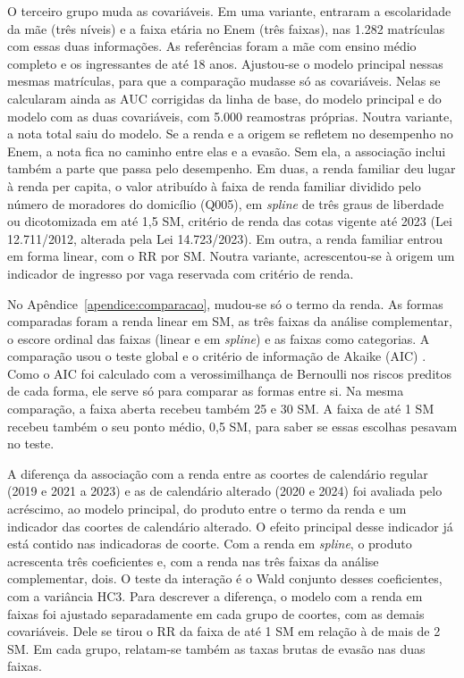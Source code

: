 \documentclass[12pt,a4paper]{article}
\begin{document}
O terceiro grupo muda as covariáveis. Em uma variante, entraram a escolaridade da mãe (três níveis) e a faixa etária no Enem (três faixas), nas 1.282 matrículas com essas duas informações. As referências foram a mãe com ensino médio completo e os ingressantes de até 18 anos. Ajustou-se o modelo principal nessas mesmas matrículas, para que a comparação mudasse só as covariáveis. Nelas se calcularam ainda as AUC corrigidas da linha de base, do modelo principal e do modelo com as duas covariáveis, com 5.000 reamostras próprias. Noutra variante, a nota total saiu do modelo. Se a renda e a origem se refletem no desempenho no Enem, a nota fica no caminho entre elas e a evasão. Sem ela, a associação inclui também a parte que passa pelo desempenho. Em duas, a renda familiar deu lugar à renda per capita, o valor atribuído à faixa de renda familiar dividido pelo número de moradores do domicílio (Q005), em \textit{spline} de três graus de liberdade ou dicotomizada em até 1,5 SM, critério de renda das cotas vigente até 2023 (Lei 12.711/2012, alterada pela Lei 14.723/2023). Em outra, a renda familiar entrou em forma linear, com o RR por SM. Noutra variante, acrescentou-se à origem um indicador de ingresso por vaga reservada com critério de renda.

No Apêndice~\ref{apendice:comparacao}, mudou-se só o termo da renda. As formas comparadas foram a renda linear em SM, as três faixas da análise complementar, o escore ordinal das faixas (linear e em \textit{spline}) e as faixas como categorias. A comparação usou o teste global e o critério de informação de Akaike (AIC) \citep{akaike1974new}. Como o AIC foi calculado com a verossimilhança de Bernoulli nos riscos preditos de cada forma, ele serve só para comparar as formas entre si. Na mesma comparação, a faixa aberta recebeu também 25 e 30 SM. A faixa de até 1 SM recebeu também o seu ponto médio, 0,5 SM, para saber se essas escolhas pesavam no teste.

A diferença da associação com a renda entre as coortes de calendário regular (2019 e 2021 a 2023) e as de calendário alterado (2020 e 2024) foi avaliada pelo acréscimo, ao modelo principal, do produto entre o termo da renda e um indicador das coortes de calendário alterado. O efeito principal desse indicador já está contido nas indicadoras de coorte. Com a renda em \textit{spline}, o produto acrescenta três coeficientes e, com a renda nas três faixas da análise complementar, dois. O teste da interação é o Wald conjunto desses coeficientes, com a variância HC3. Para descrever a diferença, o modelo com a renda em faixas foi ajustado separadamente em cada grupo de coortes, com as demais covariáveis. Dele se tirou o RR da faixa de até 1 SM em relação à de mais de 2 SM. Em cada grupo, relatam-se também as taxas brutas de evasão nas duas faixas.
\end{document}
